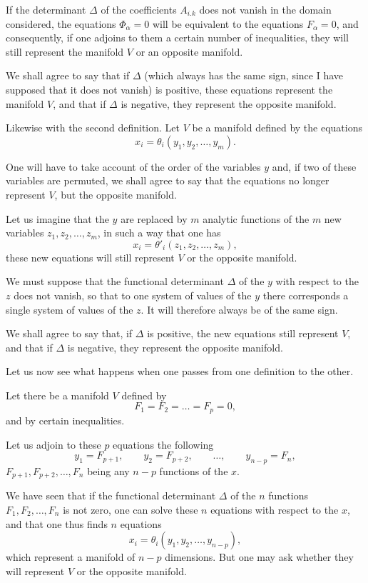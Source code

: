 \documentclass{article}
\begin{document}
If the determinant $\Delta$ of the coefficients $A_{i.k}$ does not vanish in the domain considered, the equations $\Phi_{\alpha} = 0$ will be equivalent to the equations $F_{\alpha} = 0$, and consequently, if one adjoins to them a certain number of inequalities, they will still represent the manifold $V$ or an opposite manifold.

We shall agree to say that if $\Delta$ (which always has the same sign, since I have supposed that it does not vanish) is positive, these equations represent the manifold $V$, and that if $\Delta$ is negative, they represent the opposite manifold.

Likewise with the second definition. Let $V$ be a manifold defined by the equations
\[
x_{i} = \theta_{i}(y_{1}, y_{2}, \ldots, y_{m}).
\]

One will have to take account of the order of the variables $y$ and, if two of these variables are permuted, we shall agree to say that the equations no longer represent $V$, but the opposite manifold.

Let us imagine that the $y$ are replaced by $m$ analytic functions of the $m$ new variables $z_{1}, z_{2}, \ldots, z_{m}$, in such a way that one has
\[
x_{i} = \theta'_{i}(z_{1}, z_{2}, \ldots, z_{m}),
\]
these new equations will still represent $V$ or the opposite manifold.

We must suppose that the functional determinant $\Delta$ of the $y$ with respect to the $z$ does not vanish, so that to one system of values of the $y$ there corresponds a single system of values of the $z$. It will therefore always be of the same sign.

We shall agree to say that, if $\Delta$ is positive, the new equations still represent $V$, and that if $\Delta$ is negative, they represent the opposite manifold.

Let us now see what happens when one passes from one definition to the other.

Let there be a manifold $V$ defined by
\[
F_{1} = F_{2} = \ldots = F_{p} = 0,
\]
and by certain inequalities.

Let us adjoin to these $p$ equations the following
\[
y_{1} = F_{p+1}, \qquad y_{2} = F_{p+2}, \qquad \ldots, \qquad y_{n-p} = F_{n},
\]
$F_{p+1}, F_{p+2}, \ldots, F_{n}$ being any $n - p$ functions of the $x$.

We have seen that if the functional determinant $\Delta$ of the $n$ functions $F_{1}, F_{2}, \ldots, F_{n}$ is not zero, one can solve these $n$ equations with respect to the $x$, and that one thus finds $n$ equations
\[
x_{i} = \theta_{i}(y_{1}, y_{2}, \ldots, y_{n-p}),
\]
which represent a manifold of $n - p$ dimensions. But one may ask whether they will represent $V$ or the opposite manifold.
\end{document}
